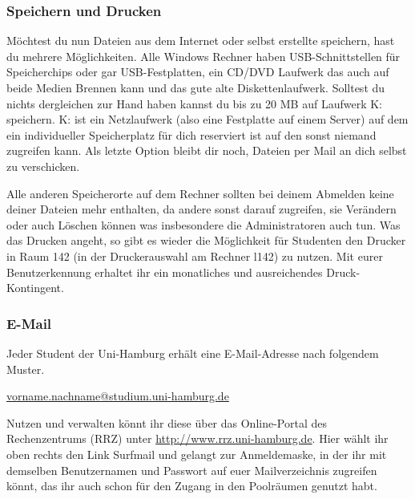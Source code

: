 
\subsubsection{Speichern und Drucken}

Möchtest du nun Dateien aus dem Internet oder selbst erstellte speichern, hast
du mehrere Möglichkeiten. Alle Windows Rechner haben USB-Schnittstellen für
Speicherchips oder gar USB-Festplatten, ein CD/DVD Laufwerk das auch auf beide
Medien Brennen kann und das gute alte Diskettenlaufwerk. Solltest du nichts
dergleichen zur Hand haben kannst du bis zu 20 MB auf Laufwerk K: speichern.
K: ist ein Netzlaufwerk (also eine Festplatte auf einem Server) auf dem ein
individueller Speicherplatz für dich reserviert ist auf den sonst niemand
zugreifen kann. Als letzte Option bleibt dir noch, Dateien per Mail an dich
selbst zu verschicken.

Alle anderen Speicherorte auf dem Rechner sollten bei deinem Abmelden keine
deiner Dateien mehr enthalten, da andere sonst darauf zugreifen, sie Verändern
oder auch Löschen können was insbesondere die Administratoren auch tun. Was das
Drucken angeht, so gibt es wieder die Möglichkeit für Studenten den Drucker in
Raum 142 (in der Druckerauswahl am Rechner l142) zu nutzen. Mit eurer
Benutzerkennung erhaltet ihr ein monatliches und ausreichendes
Druck-Kontingent.

\subsubsection{E-Mail}

Jeder Student der Uni-Hamburg erhält eine E-Mail-Adresse nach folgendem Muster.

\href{mailto:vorname.nachname@studium.uni-hamburg.de}{vorname.nachname@studium.uni-hamburg.de}

Nutzen und verwalten könnt ihr diese über das Online-Portal des Rechenzentrums
(RRZ) unter \url{http://www.rrz.uni-hamburg.de}. Hier wählt ihr oben rechts den
Link Surfmail und gelangt zur Anmeldemaske, in der ihr mit demselben
Benutzernamen und Passwort auf euer Mailverzeichnis zugreifen könnt, das ihr
auch schon für den Zugang in den Poolräumen genutzt habt.

